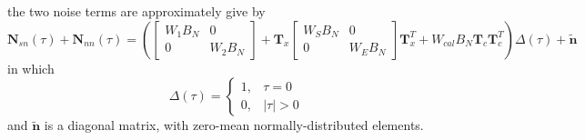\documentclass[draftcls,onecolumn]{IEEEtran}  %
\begin{document}
the two noise terms are approximately give by
\begin{equation}
\mathbf{N}_{sn} (\tau) + \mathbf{N}_{nn} (\tau) = 
\left(   \left[ \begin{array} {cc} W_1 B_N & 0 \\ 0 & W_2 B_N \end{array} \right] + \mathbf{T}_x  \left[ \begin{array} {cc} W_S B_N& 0 \\ 0 & W_E B_N \end{array} \right] \mathbf{T}_x^T 
 +W_{cal}  B_N \mathbf{T}_c   \mathbf{T}^T_c  \right) 
 \Delta(\tau) + \tilde{\mathbf{n}}
\end{equation}
in which 
\begin{equation}
\Delta(\tau) = \left\{ \begin{array}{cc}  1, & \tau = 0 \\ 0, & | \tau | > 0  \end{array}\right.
\end{equation}
and $\tilde{\mathbf{n}}$ is a diagonal matrix, with zero-mean normally-distributed elements. 


\end{document}
